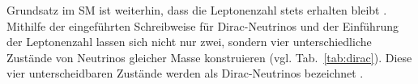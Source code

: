 \documentclass[a4paper,12pt]{article}
\newcommand{\tabref}[1]{Tab.~\ref{#1}}
\begin{document}
Grundsatz im SM ist weiterhin, dass die Leptonenzahl stets erhalten bleibt \cite[285]{Zyla2020}. Mithilfe der eingeführten Schreibweise für Dirac-Neutrinos und der Einführung der Leptonenzahl lassen sich nicht nur zwei, sondern vier unterschiedliche Zustände von Neutrinos gleicher Masse konstruieren (vgl. \tabref{tab:dirac}). Diese vier unterscheidbaren Zustände werden als Dirac-Neutrinos bezeichnet \cite[13]{Athar2022} \cite[23--25]{Athar2020}.
\end{document}
